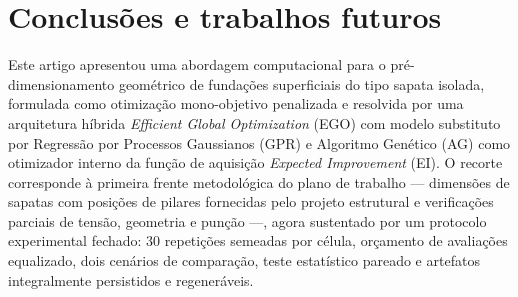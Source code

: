 \section{Conclusões e trabalhos futuros}
\label{sec:conclusoes}

Este artigo apresentou uma abordagem computacional para o pré-dimensionamento geométrico de fundações superficiais do tipo sapata isolada, formulada como otimização mono-objetivo penalizada e resolvida por uma arquitetura híbrida \textit{Efficient Global Optimization} (EGO) com modelo substituto por Regressão por Processos Gaussianos (GPR) e Algoritmo Genético (AG) como otimizador interno da função de aquisição \textit{Expected Improvement} (EI). O recorte corresponde à primeira frente metodológica do plano de trabalho — dimensões de sapatas com posições de pilares fornecidas pelo projeto estrutural e verificações parciais de tensão, geometria e punção —, agora sustentado por um protocolo experimental fechado: 30 repetições semeadas por célula, orçamento de avaliações equalizado, dois cenários de comparação, teste estatístico pareado e artefatos integralmente persistidos e regeneráveis.

